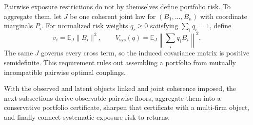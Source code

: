Pairwise exposure restrictions do not by themselves define portfolio risk.
To aggregate them, let $J$ be one coherent joint law for
$(B_1,\ldots,B_n)$ with coordinate marginals $P_i$.
For normalized risk weights $q_i\ge0$ satisfying $\sum_i q_i=1$, define
\[
  v_i=\mathbb E_J\lVert B_i\rVert^2,
  \qquad
  V_{\mathrm{sys}}(q)
  =\mathbb E_J\left\lVert\sum_i q_i B_i\right\rVert^2.
\]
The same $J$ governs every cross term, so the induced covariance matrix is
positive semidefinite.
This requirement rules out assembling a portfolio from mutually incompatible
pairwise optimal couplings.

With the observed and latent objects linked and joint coherence imposed, the
next subsections derive observable pairwise floors, aggregate them into a
conservative portfolio certificate, sharpen that certificate with a multi-firm
object, and finally connect systematic exposure risk to returns.
